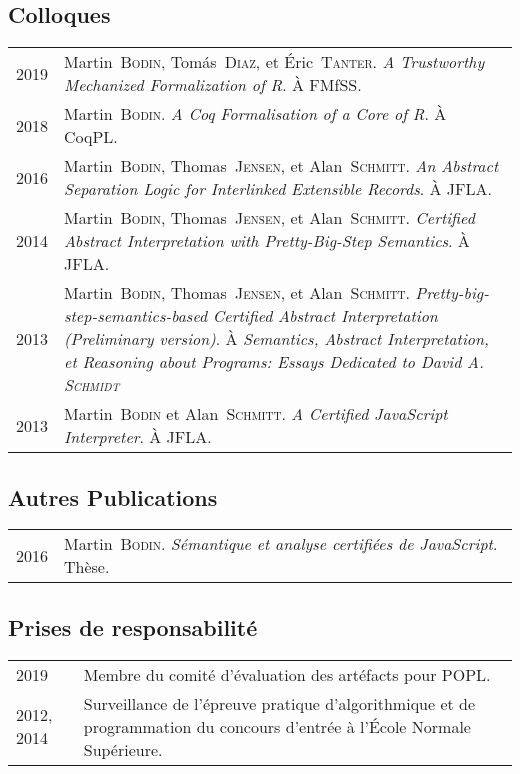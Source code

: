 \documentclass[12pt,a4paper]{article}
\makeatletter
\newenvironment{datecvsection}[1]%
               {\subsection*{#1}%
                 \noindent \begin{tabular}{@{}p{\annee}p{\texte}@{}}}
               {\end{tabular}}
\newcommand\familyName{\textsc}
\newcommand\placeName{}
\makeatother
\begin{document}
\begin{datecvsection}{Colloques}

  2019 & Martin~\familyName{Bodin}, Tomás~\familyName{Diaz}, et Éric~\familyName{Tanter}. \textit{A Trustworthy Mechanized Formalization of R}. À FMfSS. \\

  2018 & Martin~\familyName{Bodin}. \textit{A Coq Formalisation of a Core of R}. À CoqPL. \\

  2016 & Martin~\familyName{Bodin}, Thomas~\familyName{Jensen}, et Alan~\familyName{Schmitt}. \textit{An Abstract Separation Logic for Interlinked Extensible Records}. À JFLA. \\

  2014 & Martin~\familyName{Bodin}, Thomas~\familyName{Jensen}, et Alan~\familyName{Schmitt}. \textit{Certified Abstract Interpretation with Pretty-Big-Step Semantics}. À JFLA. \\

  2013 & Martin~\familyName{Bodin}, Thomas~\familyName{Jensen}, et Alan~\familyName{Schmitt}. \textit{Pretty-big-step-semantics-based Certified Abstract Interpretation (Preliminary version)}. À \textit{Semantics, Abstract Interpretation, et Reasoning about Programs: Essays Dedicated to David A. \textsc{Schmidt}} \\ %

  2013 & Martin~\familyName{Bodin} et Alan~\familyName{Schmitt}. \textit{A Certified JavaScript Interpreter}. À JFLA. \\

\end{datecvsection}

\begin{datecvsection}{Autres Publications}

    2016 & Martin~\familyName{Bodin}. \textit{Sémantique et analyse certifiées de JavaScript}. Thèse. \\

\end{datecvsection}

\begin{datecvsection}{Prises de responsabilité}

    2019 & Membre du comité d’évaluation des artéfacts pour POPL. \\

    2012, 2014 & Surveillance de l’épreuve pratique d’algorithmique et de programmation du concours d’entrée à l’\placeName{École Normale Supérieure}.

\end{datecvsection}
\end{document}
